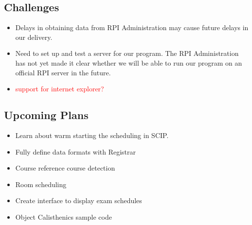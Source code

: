 \documentclass[11pt]{article}
\begin{document}
\subsection{Challenges}
\begin{itemize}
	\item Delays in obtaining data from RPI Administration may cause future delays in our delivery.
	\item Need to set up and test a server for our program. The RPI Administration has not yet made it clear whether we will be able to run our program on an official RPI server in the future.
	\item \textcolor{red}{support for internet explorer?}
\end{itemize}

\subsection{Upcoming Plans}
\begin{itemize}
	\item Learn about warm starting the scheduling in SCIP.
	\item Fully define data formats with Registrar
	\item Course reference course detection
	\item Room scheduling
	\item Create interface to display exam schedules 
	\item Object Calisthenics sample code
\end{itemize}
\end{document}
